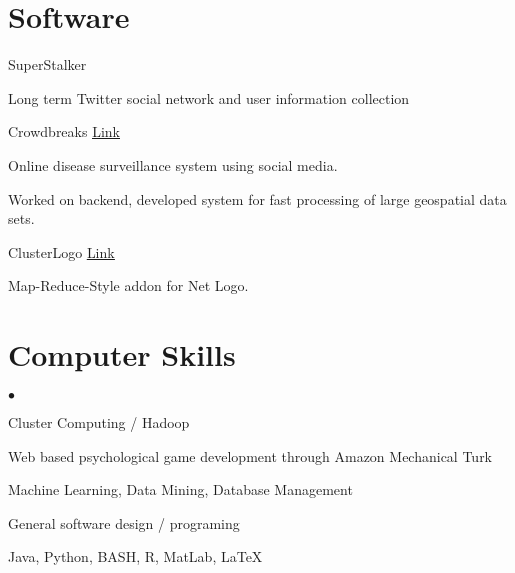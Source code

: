 \documentclass[margin,line]{res}
\newcommand{\linkToUrl}[1]{\underline{\color{blue} \href{#1}{Link}}}
\newenvironment{list1}{
  \begin{list}{\ding{113}}{%
      \setlength{\itemsep}{0in}
      \setlength{\parsep}{0in} \setlength{\parskip}{0in}
      \setlength{\topsep}{0in} \setlength{\partopsep}{0in} 
      \setlength{\leftmargin}{0.17in}}}{\end{list}}
\newenvironment{list2}{
  \begin{list}{$\bullet$}{%
      \setlength{\itemsep}{0in}
      \setlength{\parsep}{0in} \setlength{\parskip}{0in}
      \setlength{\topsep}{0in} \setlength{\partopsep}{0in} 
      \setlength{\leftmargin}{0.2in}}}{\end{list}}
\begin{document}
\begin{resume}
%

\section{\sc Software}
SuperStalker
\begin{list1}
\item[] Long term Twitter social network and user information collection
\end{list1}

Crowdbreaks \linkToUrl{http://www.crowdbreaks.com}
\begin{list1}
\item[] Online disease surveillance system using social media.
\item[] Worked on backend, developed system for fast processing of large geospatial data sets.
\end{list1}

ClusterLogo \linkToUrl{http://bit.ly/12UQ4cq}
\begin{list1}
\item[] Map-Reduce-Style addon for Net Logo.
\end{list1}

\section{\sc Computer Skills} 
\begin{list2}
\item Cluster Computing / Hadoop 
\item Web based psychological game development through Amazon Mechanical Turk
\item Machine Learning, Data Mining, Database Management
\item General software design / programing
\item Java, Python, BASH, R, MatLab, \LaTeX
\end{list2}


\end{resume}
\end{document}
